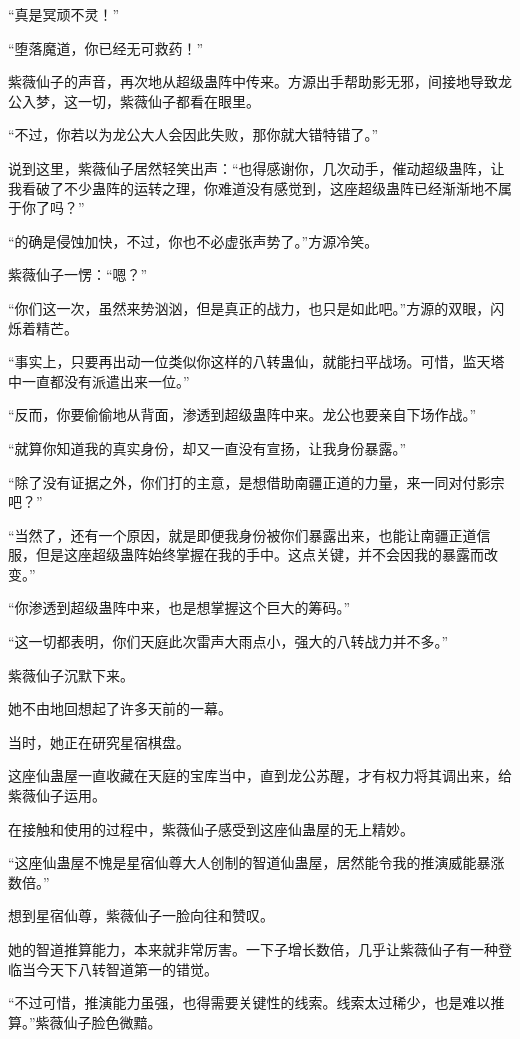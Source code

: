 \begin{this_body}
“真是冥顽不灵！”

“堕落魔道，你已经无可救药！”

紫薇仙子的声音，再次地从超级蛊阵中传来。方源出手帮助影无邪，间接地导致龙公入梦，这一切，紫薇仙子都看在眼里。

“不过，你若以为龙公大人会因此失败，那你就大错特错了。”

说到这里，紫薇仙子居然轻笑出声：“也得感谢你，几次动手，催动超级蛊阵，让我看破了不少蛊阵的运转之理，你难道没有感觉到，这座超级蛊阵已经渐渐地不属于你了吗？”

“的确是侵蚀加快，不过，你也不必虚张声势了。”方源冷笑。

紫薇仙子一愣：“嗯？”

“你们这一次，虽然来势汹汹，但是真正的战力，也只是如此吧。”方源的双眼，闪烁着精芒。

“事实上，只要再出动一位类似你这样的八转蛊仙，就能扫平战场。可惜，监天塔中一直都没有派遣出来一位。”

“反而，你要偷偷地从背面，渗透到超级蛊阵中来。龙公也要亲自下场作战。”

“就算你知道我的真实身份，却又一直没有宣扬，让我身份暴露。”

“除了没有证据之外，你们打的主意，是想借助南疆正道的力量，来一同对付影宗吧？”

“当然了，还有一个原因，就是即便我身份被你们暴露出来，也能让南疆正道信服，但是这座超级蛊阵始终掌握在我的手中。这点关键，并不会因我的暴露而改变。”

“你渗透到超级蛊阵中来，也是想掌握这个巨大的筹码。”

“这一切都表明，你们天庭此次雷声大雨点小，强大的八转战力并不多。”

紫薇仙子沉默下来。

她不由地回想起了许多天前的一幕。

当时，她正在研究星宿棋盘。

这座仙蛊屋一直收藏在天庭的宝库当中，直到龙公苏醒，才有权力将其调出来，给紫薇仙子运用。

在接触和使用的过程中，紫薇仙子感受到这座仙蛊屋的无上精妙。

“这座仙蛊屋不愧是星宿仙尊大人创制的智道仙蛊屋，居然能令我的推演威能暴涨数倍。”

想到星宿仙尊，紫薇仙子一脸向往和赞叹。

她的智道推算能力，本来就非常厉害。一下子增长数倍，几乎让紫薇仙子有一种登临当今天下八转智道第一的错觉。

“不过可惜，推演能力虽强，也得需要关键性的线索。线索太过稀少，也是难以推算。”紫薇仙子脸色微黯。


\end{this_body}
